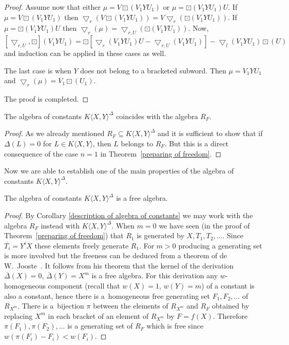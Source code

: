 \begin{proof}
Assume now that either $\mu = V\boxdot(V_1YU_1)$ or $\mu =\boxdot(V_1YU_1)U$. If $\mu = V\boxdot(V_1YU_1)$ then $\bigtriangledown_r(V\boxdot(V_1YU_1)) = V\bigtriangledown_r(\boxdot(V_1YU_1))$. If $\mu = \boxdot(V_1YU_1)U$ then $\bigtriangledown_r(\mu) = \bigtriangledown_{r,U}( \boxdot(V_1YU_1))$. Now,
\[
[\bigtriangledown_{r,U},\boxdot](V_1YU_1) =
\boxdot[\bigtriangledown_r(V_1YU_1)U - \bigtriangledown_{r,U}(V_1YU_1)] -
\bigtriangledown_l(V_1YU_1)\boxdot(U)
\]
and induction can be applied in these cases as well.

The last case is when $Y$ does not belong to a bracketed subword. Then $\mu =V_1YU_1$ and $\bigtriangledown_r(\mu) = V_1\boxdot(U_1)$.

The proof is completed.
\end{proof}

\begin{Corollary}\label{description of algebra of constants}The algebra of constants $K\langle X,Y\rangle^{\Delta}$ coincides with the algebra $R_F$.
\end{Corollary}

\begin{proof}As we already mentioned $R_F\subseteq K\langle X,Y\rangle^{\Delta}$ and it is sufficient to show that if $\Delta(L)=0$ for $L\in K\langle X,Y\rangle$, then $L$ belongs to $R_F$. But this is a direct consequence of the case $n=1$ in Theorem~\ref{preparing of freedom}.
\end{proof}

Now we are able to establish one of the main properties of the algebra of constants $K\langle X,Y\rangle^{\Delta}$.

\begin{Theorem}\label{free algebra of constants}The algebra of constants $K\langle X,Y\rangle^{\Delta}$ is a free algebra.
\end{Theorem}

\begin{proof}By Corollary \ref{description of algebra of constants} we may work with the algebra $R_F$ instead with $K\langle X,Y\rangle^{\Delta}$. When $m = 0$ we have seen (in the proof of Theorem~\ref{preparing of freedom}) that $R_1$ is generated by $X,T_1, T_2, \ldots$. Since $\overline{T_i} = Y^iX$ these elements freely generate $R_1$. For $m > 0$ producing a generating set is more involved but the freeness can be deduced from a theorem of de W.~Jooste~\cite{Jo}. It follows from his theorem that the kernel of the derivation $\overline{\Delta}(X) = 0$, $\overline{\Delta}(Y) =X^m$ is a free algebra. For this derivation any $w$-homogeneous component (recall that $w(X) = 1$, $w(Y) = m$) of a constant is also a constant, hence there is a~homogeneous free generating set $F_1, F_2, \ldots$ of $R_{X^m}$. There is a~bijection $\pi$ between the elements of $R_{X^m}$ and $R_F$ obtained by replacing $X^m$ in each bracket of an element of $R_{X^m}$ by $F=f(X)$. Therefore $\pi(F_1), \pi(F_2), \ldots$ is a generating set of $R_F$ which is free since $w(\pi(F_i) - F_i) < w(F_i)$.
\end{proof}


